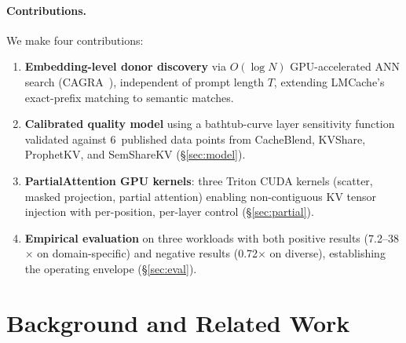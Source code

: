 \documentclass[11pt,twocolumn]{article}
\begin{document}
\paragraph{Contributions.}
We make four contributions:
\begin{enumerate}[leftmargin=*,nosep]
\item \textbf{Embedding-level donor discovery} via $O(\log N)$
  GPU-accelerated ANN search (CAGRA~\cite{cagra}), independent of
  prompt length $T$, extending LMCache's exact-prefix matching to
  semantic matches.

\item \textbf{Calibrated quality model} using a bathtub-curve layer
  sensitivity function validated against 6~published data points from
  CacheBlend, KVShare, ProphetKV, and SemShareKV (\S\ref{sec:model}).

\item \textbf{PartialAttention GPU kernels}: three Triton CUDA kernels
  (scatter, masked projection, partial attention) enabling
  non-contiguous KV tensor injection with per-position, per-layer
  control (\S\ref{sec:partial}).

\item \textbf{Empirical evaluation} on three workloads with both
  positive results (7.2--38$\times$ on domain-specific) and negative
  results (0.72$\times$ on diverse), establishing the operating
  envelope (\S\ref{sec:eval}).
\end{enumerate}


\section{Background and Related Work}
\label{sec:related}
\end{document}
